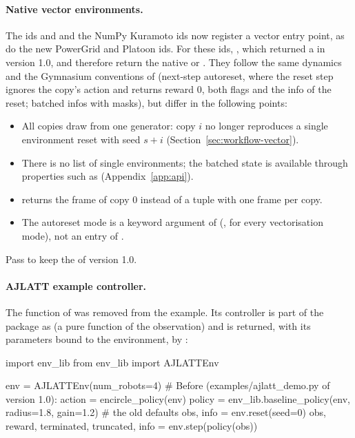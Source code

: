 \paragraph{Native vector environments.} The ids  and
 and the NumPy Kuramoto ids now register a vector entry
point, as do the new PowerGrid and Platoon ids. For these ids,
, which returned a  in
version 1.0, and  therefore return the native
 or . They follow the
same dynamics and the Gymnasium conventions of  (next-step
autoreset, where the reset step ignores the copy's action and returns reward
0, both flags  and the info of the reset; batched infos with
 masks), but differ in the following points:
\begin{itemize}
  \item All copies draw from one generator: copy $i$ no longer reproduces a
    single environment reset with seed $s + i$
    (Section~\ref{sec:workflow-vector}).
  \item There is no  list of single environments; the batched
    state is available through properties such as 
    (Appendix~\ref{app:api}).
  \item {} returns the frame of copy 0 instead of a tuple with
    one frame per copy.
  \item The autoreset mode is a keyword argument of 
    (, for every vectorisation mode), not an
    entry of .
\end{itemize}
Pass  to keep the  of
version 1.0.

\paragraph{AJLATT example controller.} The function  of  was removed from the example.
Its controller is part of the package as 
(a pure function of the observation) and is returned, with its parameters bound
to the environment, by :

\begin{pycode}
import env_lib
from env_lib import AJLATTEnv

env = AJLATTEnv(num_robots=4)
# Before (examples/ajlatt_demo.py of version 1.0): action = encircle_policy(env)
policy = env_lib.baseline_policy(env, radius=1.8, gain=1.2)   # the old defaults
obs, info = env.reset(seed=0)
obs, reward, terminated, truncated, info = env.step(policy(obs))
\end{pycode}

